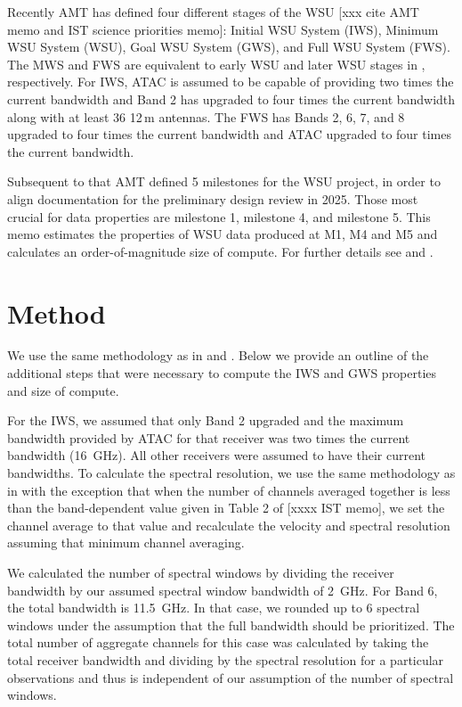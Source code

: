 \documentclass[preprint]{aastex631}
\begin{document}
Recently AMT has defined four different stages of the WSU [xxx cite AMT memo and IST science priorities memo]: Initial WSU System (IWS), Minimum WSU System (WSU), Goal WSU System (GWS), and Full WSU System (FWS). The MWS and FWS are equivalent to early WSU and later WSU stages in \citet{Kepley2024DataProperties}, respectively.  For IWS, ATAC is assumed to be capable of providing two times the current bandwidth and Band 2 has upgraded to four times the current bandwidth along with at least 36 12\,m antennas. The FWS has Bands 2, 6, 7, and 8 upgraded  to four times the current bandwidth and ATAC upgraded to four times the current bandwidth.

Subsequent to that AMT defined 5 milestones for the WSU project, in order to align documentation for the preliminary design review in 2025. Those most crucial for data properties are milestone 1, milestone 4, and milestone 5. This memo estimates the properties of WSU data produced at M1, M4 and M5 and calculates an order-of-magnitude size of compute.  For further details see \citet{Kepley2024DataProperties} and \citet{Kepley2024DataEstimate}.

\section{Method} \label{sec:method}


We use the same methodology as in \citet{Kepley2024DataProperties} and \citep{Kepley2024DataEstimate}. Below we provide an outline of the additional steps that were necessary to compute the IWS and GWS properties and size of compute.

For the IWS, we assumed that only Band 2 upgraded and the maximum bandwidth provided by ATAC for that receiver was two times the current bandwidth (16~GHz). All other receivers were assumed to  have their current bandwidths.  To calculate the spectral resolution, we use the same methodology as in \citet{Kepley2024DataProperties} with the exception that when the number of channels averaged together is less than the band-dependent value given in Table 2 of [xxxx IST memo], we set the channel average to that value and recalculate the velocity and spectral resolution assuming that minimum channel averaging.

We calculated the number of spectral windows by dividing the receiver bandwidth by our assumed spectral window bandwidth of 2~GHz. For Band 6, the total bandwidth is 11.5~GHz. In that case, we rounded up to 6 spectral windows under the assumption that the full bandwidth should be prioritized. The total number of aggregate channels for this case was calculated by taking the total receiver bandwidth and dividing by the spectral resolution for a particular observations and thus is independent of our assumption of the number of spectral windows.
\end{document}
